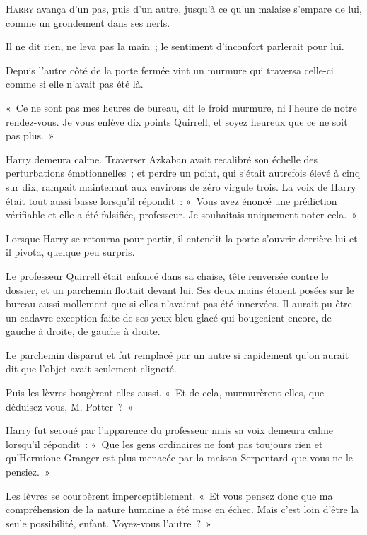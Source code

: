 
\lettrine{H}{arry} avança d'un pas, puis d'un autre, jusqu'à ce qu'un malaise s'empare de lui, comme un grondement dans ses nerfs.

Il ne dit rien, ne leva pas la main~; le sentiment d'inconfort parlerait pour lui.

Depuis l'autre côté de la porte fermée vint un murmure qui traversa celle-ci comme si elle n'avait pas été là.

«~Ce ne sont pas mes heures de bureau, dit le froid murmure, ni l'heure de notre rendez-vous. Je vous enlève dix points Quirrell, et soyez heureux que ce ne soit pas plus.~»

Harry demeura calme. Traverser Azkaban avait recalibré son échelle des perturbations émotionnelles~; et perdre un point, qui s'était autrefois élevé à cinq sur dix, rampait maintenant aux environs de zéro virgule trois. La voix de Harry était tout aussi basse lorsqu'il répondit~: «~Vous avez énoncé une prédiction vérifiable et elle a été falsifiée, professeur. Je souhaitais uniquement noter cela.~»

Lorsque Harry se retourna pour partir, il entendit la porte s'ouvrir derrière lui et il pivota, quelque peu surpris.

Le professeur Quirrell était enfoncé dans sa chaise, tête renversée contre le dossier, et un parchemin flottait devant lui. Ses deux mains étaient posées sur le bureau aussi mollement que si elles n'avaient pas été innervées. Il aurait pu être un cadavre exception faite de ses yeux bleu glacé qui bougeaient encore, de gauche à droite, de gauche à droite.

Le parchemin disparut et fut remplacé par un autre si rapidement qu'on aurait dit que l'objet avait seulement clignoté.

Puis les lèvres bougèrent elles aussi. «~Et de cela, murmurèrent-elles, que déduisez-vous, M. Potter~?~»

Harry fut secoué par l'apparence du professeur mais sa voix demeura calme lorsqu'il répondit~: «~Que les gens ordinaires ne font pas toujours rien et qu'Hermione Granger est plus menacée par la maison Serpentard que vous ne le pensiez.~»

Les lèvres se courbèrent imperceptiblement. «~Et vous pensez donc que ma compréhension de la nature humaine a été mise en échec. Mais c'est loin d'être la seule possibilité, enfant. Voyez-vous l'autre~?~»

